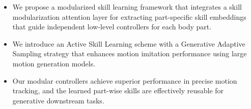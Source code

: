 \begin{itemize} 
\item We propose a modularized skill learning framework that integrates a skill modularization attention layer for extracting part-specific skill embeddings that guide independent low-level controllers for each body part.
\item We introduce an Active Skill Learning scheme with a Generative Adaptive Sampling strategy that enhances motion imitation performance using large motion generation models. 
\item Our modular controllers achieve superior performance in precise motion tracking, and the learned part-wise skills are effectively reusable for generative downstream tasks. \end{itemize}

